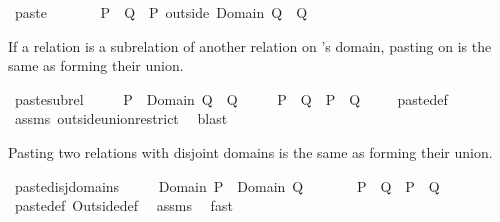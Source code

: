 \begin{isabellebody}
\begin{isamarkuptext}
\end{isamarkuptext}%
\isamarkuptrue%
\isamarkupfalse%
\ paste\ {\isacharparenleft}\ {\isachardoublequoteopen}{\isacharplus}{\isacharasterisk}{\isachardoublequoteclose}\ {}{}{\isacharparenright}\isanewline
\ \ \ \ {\isachardoublequoteopen}P\ {\isacharplus}{\isacharasterisk}\ Q\ {\isacharequal}\ {\isacharparenleft}P\ outside\ Domain\ Q{\isacharparenright}\ {\isasymunion}\ Q{\isachardoublequoteclose}%
\begin{isamarkuptext}%
If a relation  is a subrelation of another relation  on 's
  domain, pasting  on  is the same as forming their union.%
\end{isamarkuptext}%
\isamarkuptrue%
\isamarkupfalse%
\ paste{\isacharunderscore}subrel{\isacharcolon}\ \isanewline
\ \ \ \ {\isachardoublequoteopen}P\ {\isacharbar}{\isacharbar}\ Domain\ Q\ {\isasymsubseteq}\ Q{\isachardoublequoteclose}\ \isanewline
\ \ \ \ {\isachardoublequoteopen}P\ {\isacharplus}{\isacharasterisk}\ Q\ {\isacharequal}\ P\ {\isasymunion}\ Q{\isachardoublequoteclose}\isanewline
%
\isadelimproof
\ \ \ %
\endisadelimproof
%
\isatagproof
{}\isamarkupfalse%
\ paste{\isacharunderscore}def\ \isamarkupfalse%
\ assms\ outside{\isacharunderscore}union{\isacharunderscore}restrict\ \isamarkupfalse%
\ blast%
\endisatagproof
{\isafoldproof}%
%
\isadelimproof
%
\endisadelimproof
%
\begin{isamarkuptext}%
Pasting two relations with disjoint domains is the same as forming their union.%
\end{isamarkuptext}%
\isamarkuptrue%
\isamarkupfalse%
\ paste{\isacharunderscore}disj{\isacharunderscore}domains{\isacharcolon}\ \isanewline
\ \ \ \ {\isachardoublequoteopen}Domain\ P\ {\isasyminter}\ Domain\ Q\ {\isacharequal}\ {\isacharbraceleft}{\isacharbraceright}{\isachardoublequoteclose}\ \isanewline
\ \ \ \ {\isachardoublequoteopen}P\ {\isacharplus}{\isacharasterisk}\ Q\ {\isacharequal}\ P\ {\isasymunion}\ Q{\isachardoublequoteclose}\isanewline
%
\isadelimproof
\ \ \ %
\endisadelimproof
%
\isatagproof
{}\isamarkupfalse%
\ paste{\isacharunderscore}def\ Outside{\isacharunderscore}def\ \isamarkupfalse%
\ assms\ \isamarkupfalse%
\ fast%
\endisatagproof
{\isafoldproof}%
%
\isadelimproof
%
\endisadelimproof
%
\begin{isamarkuptext}%

\end{isamarkuptext}
\end{isabellebody}
